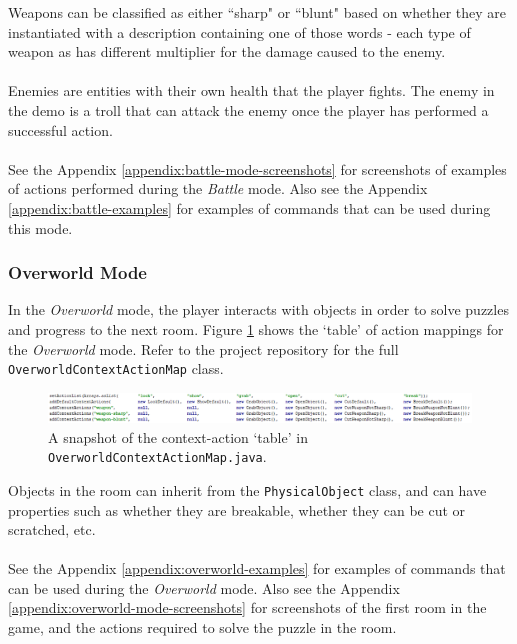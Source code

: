 \documentclass[11pt]{article}
\begin{document}
Weapons can be classified as either ``sharp" or ``blunt" based on whether they are instantiated with a description containing one of those words - each type of weapon as has different multiplier for the damage caused to the enemy.
\\
\\
Enemies are entities with their own health that the player fights. The enemy in the demo is a troll that can attack the enemy once the player has performed a successful action.
\\
\\
See the Appendix \ref{appendix:battle-mode-screenshots} for screenshots of examples of actions performed during the \textit{Battle} mode. Also see the Appendix \ref{appendix:battle-examples} for examples of commands that can be used during this mode.

\subsubsection{Overworld Mode}

In the \textit{Overworld} mode, the player interacts with objects in order to solve puzzles and progress to the next room. Figure \ref{fig:overworld-context-action-map} shows the `table' of action mappings for the \textit{Overworld} mode. Refer to the project repository for the full \texttt{OverworldContextActionMap} class.

\begin{center}
\begin{figure}[H]
\begin{center}
  \includegraphics[width=\linewidth]{overworld-context-action-map.png}
  \caption{A snapshot of the context-action `table' in \texttt{OverworldContextActionMap.java}.}
  \label{fig:overworld-context-action-map}
  \end{center}
\end{figure}
\end{center}

Objects in the room can inherit from the \texttt{PhysicalObject} class, and can have properties such as whether they are breakable, whether they can be cut or scratched, etc.
\\
\\
See the Appendix \ref{appendix:overworld-examples} for examples of commands that can be used during the \textit{Overworld} mode. Also see the Appendix \ref{appendix:overworld-mode-screenshots} for screenshots of the first room in the game, and the actions required to solve the puzzle in the room.
\end{document}
